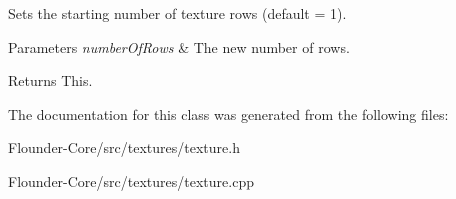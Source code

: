 Sets the starting number of texture rows (default = 1). 


\begin{DoxyParams}{Parameters}
{\em number\+Of\+Rows} & The new number of rows. \\
\hline
\end{DoxyParams}
\begin{DoxyReturn}{Returns}
This. 
\end{DoxyReturn}


The documentation for this class was generated from the following files\+:\begin{DoxyCompactItemize}
\item 
Flounder-\/\+Core/src/textures/texture.\+h\item 
Flounder-\/\+Core/src/textures/texture.\+cpp\end{DoxyCompactItemize}
